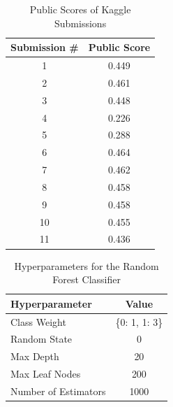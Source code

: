 \documentclass{article} %
\begin{document}
\begin{table}[ht!]
    \centering
    \begin{tabular}{|c|c|}
        \hline
        \textbf{Submission \#} & \textbf{Public Score} \\ \hline
        1 & 0.449 \\ \hline
        2 & 0.461 \\ \hline
        3 & 0.448 \\ \hline
        4 & 0.226 \\ \hline
        5 & 0.288 \\ \hline
        6 & 0.464 \\ \hline
        7 & 0.462 \\ \hline
        8 & 0.458 \\ \hline
        9 & 0.458 \\ \hline
        10 & 0.455 \\ \hline
        11 & 0.436 \\ \hline
    \end{tabular}
    \caption{Public Scores of Kaggle Submissions}
    \label{tab:kaggle-scores}
 \end{table}



 \begin{table}[ht!]
    \centering
    \begin{tabular}{|l|c|}
        \hline
        \textbf{Hyperparameter} & \textbf{Value} \\ \hline
        Class Weight & \{0: 1, 1: 3\} \\ \hline
        Random State & 0 \\ \hline
        Max Depth & 20 \\ \hline
        Max Leaf Nodes & 200 \\ \hline
        Number of Estimators & 1000 \\ \hline
    \end{tabular}
    \caption{Hyperparameters for the Random Forest Classifier}
    \label{tab:random-forest-hyperparameters}
 \end{table}
\end{document}
